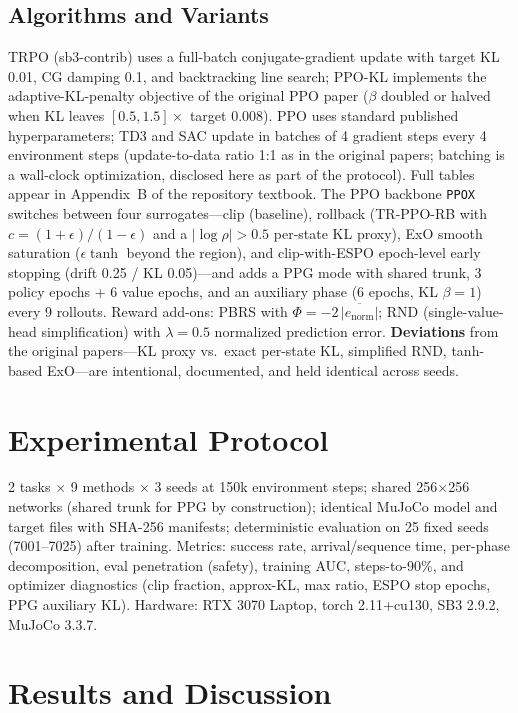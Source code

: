 \documentclass[conference]{IEEEtran}
\newcommand{\code}[1]{\texttt{#1}}
\begin{document}
\subsection{Algorithms and Variants}
TRPO (sb3-contrib) uses a full-batch conjugate-gradient update with target
KL 0.01, CG damping 0.1, and backtracking line search; PPO-KL implements the
adaptive-KL-penalty objective of the original PPO paper ($\beta$ doubled or
halved when KL leaves $[0.5,1.5]\times$ target 0.008). PPO uses standard
published hyperparameters; TD3 and SAC update in batches of
4 gradient steps every 4 environment steps (update-to-data ratio 1:1 as in the
original papers; batching is a wall-clock optimization, disclosed here as part
of the protocol). Full tables appear in Appendix~B of the repository textbook. The PPO backbone \code{PPOX} switches between four
surrogates---clip (baseline), rollback (TR-PPO-RB with $c=(1{+}\epsilon)/(1{-}\epsilon)$
and a $|\log\rho|>0.5$ per-state KL proxy), ExO smooth saturation
($\epsilon\tanh$ beyond the region), and clip-with-ESPO epoch-level early
stopping (drift 0.25 / KL 0.05)---and adds a PPG mode with shared trunk,
3 policy epochs + 6 value epochs, and an auxiliary phase (6 epochs, KL
$\beta{=}1$) every 9 rollouts. Reward add-ons: PBRS with
$\Phi=-2\,\overline{|e_{\mathrm{norm}}|}$; RND (single-value-head
simplification) with $\lambda{=}0.5$ normalized prediction error.
\textbf{Deviations} from the original papers---KL proxy vs.\ exact per-state
KL, simplified RND, tanh-based ExO---are intentional, documented, and held
identical across seeds.

\section{Experimental Protocol}
2 tasks $\times$ 9 methods $\times$ 3 seeds at 150k environment steps; shared
256$\times$256 networks (shared trunk for PPG by construction); identical
MuJoCo model and target files with SHA-256 manifests; deterministic
evaluation on 25 fixed seeds (7001--7025) after training. Metrics: success
rate, arrival/sequence time, per-phase decomposition, eval penetration
(safety), training AUC, steps-to-90\%, and optimizer diagnostics (clip
fraction, approx-KL, max ratio, ESPO stop epochs, PPG auxiliary KL).
Hardware: RTX 3070 Laptop, torch 2.11+cu130, SB3 2.9.2, MuJoCo 3.3.7.

\section{Results and Discussion}\label{sec:results}

\end{document}
